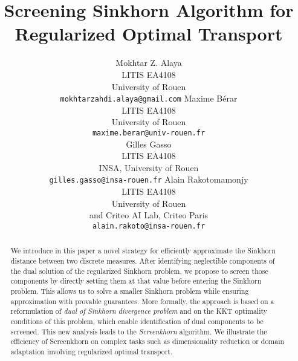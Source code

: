 \documentclass{article}
\title{Screening Sinkhorn Algorithm for Regularized Optimal Transport}
\begin{document}
\author{%
Mokhtar Z. Alaya \\
LITIS EA4108\\
University of Rouen\\
\texttt{mokhtarzahdi.alaya@gmail.com} 
\And
Maxime Bérar\\
LITIS EA4108\\
University of Rouen\\
\texttt{maxime.berar@univ-rouen.fr} \\
\And
Gilles Gasso \\
LITIS EA4108\\
INSA, University of Rouen\\
\texttt{gilles.gasso@insa-rouen.fr} 
\And
Alain Rakotomamonjy\\
LITIS EA4108 \\
University of Rouen\\
and Criteo AI Lab, Criteo Paris \\
\texttt{alain.rakoto@insa-rouen.fr} \\
}

\maketitle

\begin{abstract}
We introduce in this paper a novel strategy for efficiently approximate the Sinkhorn distance between two discrete measures. After identifying neglectible components
of the dual solution of the regularized Sinkhorn problem, we propose to screen those components by directly setting them at that value before entering the Sinkhorn problem. This allows us to solve a smaller Sinkhorn problem while ensuring approximation with provable guarantees.
More formally, the approach is based on a reformulation of \emph{dual of Sinkhorn divergence problem} and on the KKT optimality conditions of this problem, which enable identification of dual components to be screened.
This new analysis leads to the \emph{Screenkhorn} algorithm.
We illustrate the efficiency of Screenkhorn on complex tasks such as dimensionality reduction or domain adaptation involving regularized optimal transport.
\end{abstract}






\end{document}
